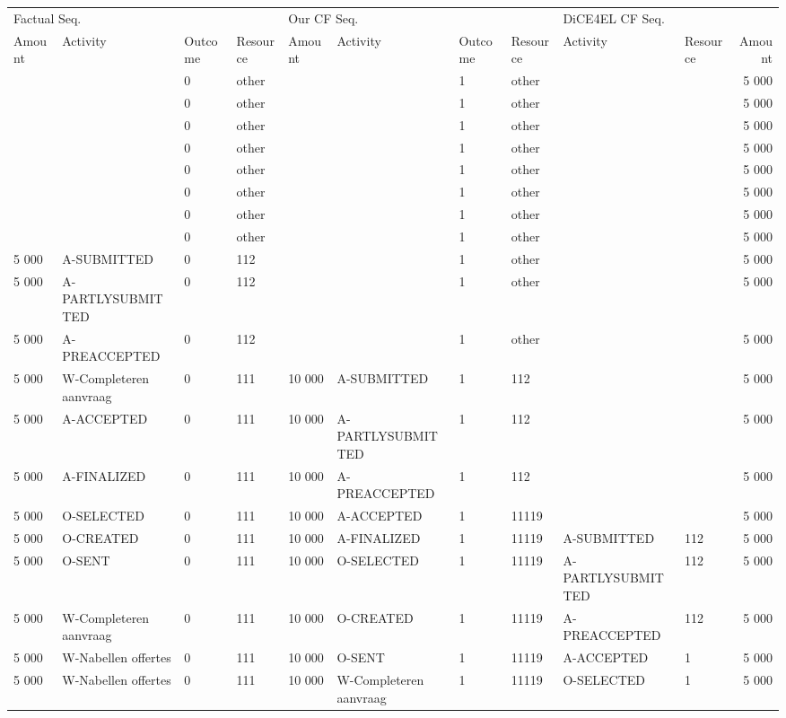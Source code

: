 \begin{tabular}{llllllllllr}
\toprule
\multicolumn{4}{l}{Factual Seq.} & \multicolumn{4}{l}{Our CF Seq.} & \multicolumn{3}{l}{DiCE4EL CF Seq.} \\
Amount & Activity & Outcome & Resource & Amount & Activity & Outcome & Resource & Activity & Resource & Amount \\
\midrule
 &  & 0 & other &  &  & 1 & other &  &  & 5 000 \\
 &  & 0 & other &  &  & 1 & other &  &  & 5 000 \\
 &  & 0 & other &  &  & 1 & other &  &  & 5 000 \\
 &  & 0 & other &  &  & 1 & other &  &  & 5 000 \\
 &  & 0 & other &  &  & 1 & other &  &  & 5 000 \\
 &  & 0 & other &  &  & 1 & other &  &  & 5 000 \\
 &  & 0 & other &  &  & 1 & other &  &  & 5 000 \\
 &  & 0 & other &  &  & 1 & other &  &  & 5 000 \\
5 000 & A-SUBMITTED & 0 & 112 &  &  & 1 & other &  &  & 5 000 \\
5 000 & A-PARTLYSUBMITTED & 0 & 112 &  &  & 1 & other &  &  & 5 000 \\
5 000 & A-PREACCEPTED & 0 & 112 &  &  & 1 & other &  &  & 5 000 \\
5 000 & W-Completeren aanvraag & 0 & 111 & 10 000 & A-SUBMITTED & 1 & 112 &  &  & 5 000 \\
5 000 & A-ACCEPTED & 0 & 111 & 10 000 & A-PARTLYSUBMITTED & 1 & 112 &  &  & 5 000 \\
5 000 & A-FINALIZED & 0 & 111 & 10 000 & A-PREACCEPTED & 1 & 112 &  &  & 5 000 \\
5 000 & O-SELECTED & 0 & 111 & 10 000 & A-ACCEPTED & 1 & 11119 &  &  & 5 000 \\
5 000 & O-CREATED & 0 & 111 & 10 000 & A-FINALIZED & 1 & 11119 & A-SUBMITTED & 112 & 5 000 \\
5 000 & O-SENT & 0 & 111 & 10 000 & O-SELECTED & 1 & 11119 & A-PARTLYSUBMITTED & 112 & 5 000 \\
5 000 & W-Completeren aanvraag & 0 & 111 & 10 000 & O-CREATED & 1 & 11119 & A-PREACCEPTED & 112 & 5 000 \\
5 000 & W-Nabellen offertes & 0 & 111 & 10 000 & O-SENT & 1 & 11119 & A-ACCEPTED & 1 & 5 000 \\
5 000 & W-Nabellen offertes & 0 & 111 & 10 000 & W-Completeren aanvraag & 1 & 11119 & O-SELECTED & 1 & 5 000 \\

\end{tabular}
